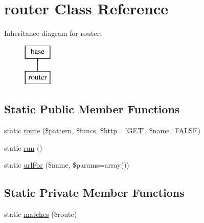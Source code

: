 \hypertarget{classrouter}{
\section{router Class Reference}
\label{classrouter}
}
Inheritance diagram for router:\begin{figure}[H]
\begin{center}
\leavevmode
\includegraphics[height=2.000000cm]{classrouter}
\end{center}
\end{figure}
\subsection*{Static Public Member Functions}
\begin{DoxyCompactItemize}
\item 
static \hyperlink{classrouter_aafd29366ef6399da1dd079fc131d8858}{route} (\$pattern, \$funcs, \$http= 'GET', \$name=FALSE)
\item 
static \hyperlink{classrouter_ad3a572002fd350672b531756f7306e8f}{run} ()
\item 
static \hyperlink{classrouter_a2c24b81993e81c6401edd6c4caff0336}{urlFor} (\$name, \$params=array())
\end{DoxyCompactItemize}
\subsection*{Static Private Member Functions}
\begin{DoxyCompactItemize}
\item 
static \hyperlink{classrouter_a78ab5fc58d307458ac8767f50178fc7a}{matches} (\$route)
\end{DoxyCompactItemize}


